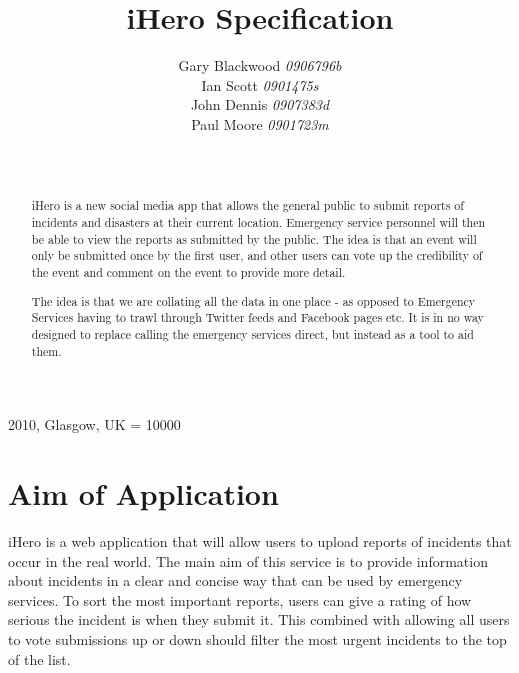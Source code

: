 \documentclass{sig-alt-release2}
\begin{document}
\newcommand{\todo}[1]{\textcolor{red}{#1}}
\def\newblock{\hskip .11em plus .33em minus .07em}

 {2010, Glasgow, UK} 
\widowpenalty = 10000

\title{{iHero Specification}}

\author{
\alignauthor 
Gary Blackwood \textit{0906796b}\\
Ian Scott \textit{0901475s}\\
John Dennis \textit{0907383d}\\
Paul Moore \textit{0901723m}\\
\\
\\
}
\maketitle

\begin{abstract}
iHero is a new social media app that allows the general public to submit reports of incidents and disasters at their current location. Emergency service personnel will then be able to view the reports as submitted by the public. The idea is that an event will only be submitted once by the first user, and other users can vote up the credibility of the event and comment on the event to provide more detail.

The idea is that we are collating all the data in one place - as opposed to Emergency Services having to trawl through Twitter feeds and Facebook pages etc. It is in no way designed to replace calling the emergency services direct, but instead as a tool to aid them.
\end{abstract}

\section{Aim of Application}
iHero is a web application that will allow users to upload reports of incidents that occur in the real world. The main aim of this service is to provide information about incidents in a clear and concise way that can be used by emergency services. To sort the most important reports, users can give a rating of how serious the incident is when they submit it. This combined with allowing all users to vote submissions up or down should filter the most urgent incidents to the top of the list.
\end{document}
